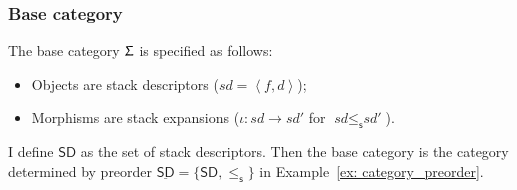 \documentclass[12pt,a4paper]{report}
\theoremstyle{definition}
\newcommand{\ang}[1]{\left\langle #1 \right\rangle}
\begin{document}
    \subsubsection{Base category}
    The base category $\Upsigma$ is specified as follows:
    \begin{itemize}
        \item Objects are stack descriptors ($\textit{sd} = \ang{f, d}$);
        \item Morphisms are stack expansions ($\iota : \textit{sd} \to \textit{sd′}$ for $\textit{sd} \leq_\mathsf{s} \textit{sd′}$).
    \end{itemize}
    I define $\mathsf{SD}$ as the set of stack descriptors. Then the base category is the category determined by preorder $\underline{\mathsf{SD}} = \{\mathsf{SD}, \leq_\mathsf{s}\}$ in Example~\ref{ex: category_preorder}.
\end{document}
